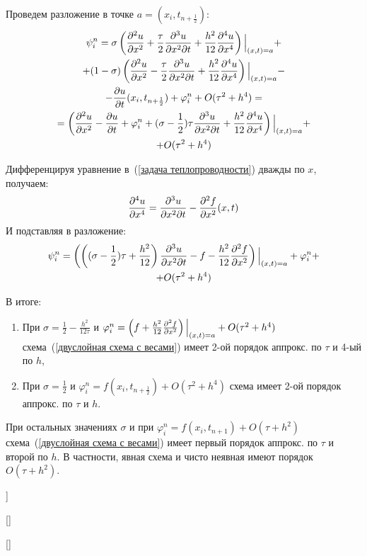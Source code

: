 \begin{Commentwhite}
\newcommand*{\point}{\ensuremath{(x_i,t_{n+\frac{1}{2}})}}
Проведем разложение в точке $a=\point$:
\begin{gather*}
    \psi_i^n = \sigma\left( \deltwo{u}{x} + \frac{\tau}{2}\frac{\partial^3 u}{\partial x^2 \partial t} + \frac{h^2}{12}\deln{u}{x}{4} \right)\Big|_{(x,t)=a} + 
    \\
    + (1 - \sigma)\left( \deltwo{u}{x} - \frac{\tau}{2}\frac{\partial^3 u}{\partial x^2 \partial t} + \frac{h^2}{12}\deln{u}{x}{4} \right)\Big|_{(x,t)=a} -
    \\
    - \del{u}{t}\point + \varphi_i^n + O(\tau^2 + h^4) = 
    \\
    = \left(\deltwo{u}{x} - \del{u}{t} + \varphi_i^n + (\sigma - \frac{1}{2})\tau\frac{\partial^3 u}{\partial x^2 \partial t} + \frac{h^2}{12}\deln{u}{x}{4}\right)\Big|_{(x,t)=a} + 
    \\
    + O(\tau^2 + h^4)
\end{gather*}

Дифференцируя уравнение в~(\ref{задача теплопроводности}) дважды по $x$, получаем:
$$\frac{\partial^{4} u}{\partial x^{4}} = \frac{\partial^3 u}{\partial x^2 \partial t} - \frac{\partial^2 f}{\partial x^2}(x,t)$$
И подставляя в разложение:
\begin{gather*}
    \psi_i^n = \left( \left((\sigma - \frac{1}{2})\tau + \frac{h^2}{12}\right)\frac{\partial^3 u}{\partial x^2 \partial t} - f -\frac{h^2}{12}\frac{\partial^2 f}{\partial x^2} \right)\Big|_{(x,t)=a} + \varphi_i^n +
    \\
    + O(\tau^2 + h^4)
\end{gather*}

В итоге:
\begin{enumerate}
    \item При $\sigma = \frac{1}{2} - \frac{h^2}{12\tau}$ и $\varphi_i^n = \left(f + \frac{h^2}{12}\frac{\partial^2 f}{\partial x^2}\right)\Big|_{(x,t)=a} + O(\tau^2 + h^4)$ схема~(\ref{двуслойная схема с весами}) имеет 2-ой порядок аппрокс. по $\tau$ и 4-ый по $h$,
    \item При $\sigma = \frac{1}{2}$ и $\varphi_i^n = f\point + O(\tau^2 + h^4)$ схема имеет 2-ой порядок аппрокс. по $\tau$ и $h$.
\end{enumerate}

При остальных значениях $\sigma$ и при $\varphi_i^n = f(x_i, t_{n+1}) + O(\tau + h^2)$ схема~(\ref{двуслойная схема с весами}) имеет первый порядок аппрокс. по $\tau$ и второй по $h$. В частности, явная схема и чисто неявная имеют порядок $O(\tau + h^2)$.
\end{Commentwhite}


\bigbreak
[\cite[41-42]{chmmf}]

[\cite[272-273, 276-279]{chm_samarski_gulin}]

[\cite[259-261]{tickets2022}]
